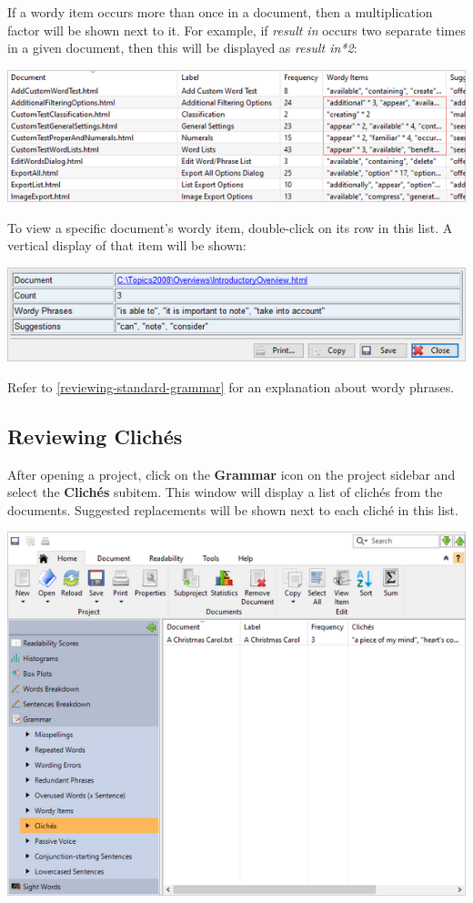 \documentclass[
]{book}
\theoremstyle{definition}
\theoremstyle{definition}
\theoremstyle{definition}
\theoremstyle{definition}
\theoremstyle{remark}
\begin{document}
If a wordy item occurs more than once in a document, then a multiplication factor will be shown next to it. For example, if \emph{result in} occurs two separate times in a given document, then this will be displayed as \emph{result in*2}:

\includegraphics{Images/batchwordyphrasesmultiple.png}

To view a specific document's wordy item, double-click on its row in this list. A vertical display of that item will be shown:

\begin{center}\includegraphics[width=0.75\linewidth,]{Images/viewitemwordyphrase} \end{center}

Refer to \ref{reviewing-standard-grammar} for an explanation about wordy phrases.

\hypertarget{reviewing-batch-cliches}{%
\subsection*{Reviewing Clichés}\label{reviewing-batch-cliches}}

After opening a project, click on the \textbf{Grammar} icon on the project sidebar and select the \textbf{Clichés} subitem. This window will display a list of clichés from the documents. Suggested replacements will be shown next to each cliché in this list.

\includegraphics{Images/batchcliches.png}
\end{document}
